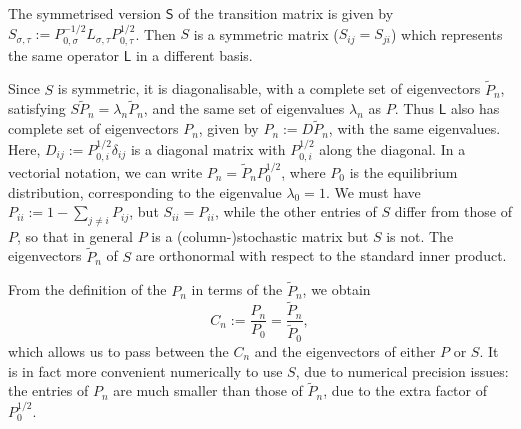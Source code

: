 \documentclass[10pt]{article}
\newcommand{\defeq}{:=}
\newcommand{\tP}{\tilde{P}}
\newcommand{\LL}{\mathsf{L}}
\renewcommand{\SS}{\mathsf{S}}
\newcommand{\transp}{^{\text{\small T}}}
\begin{document}
The symmetrised version  $\SS$ of the transition matrix
is given by $S_{\sigma, \tau} \defeq P_{0,\sigma}^{-1/2} L_{\sigma, \tau} P_{0,\tau}^{1/2}$.
  Then
$S$ is a symmetric
matrix ($S_{ij} = S_{ji}$) which represents the same operator $\LL$ in a
different
basis.  

Since $S$ is symmetric, it is diagonalisable, with a complete set of
eigenvectors $\tP_n$, satisfying $S \tP_n = \lambda_n \tP_n$, and the same set
of
eigenvalues $\lambda_n$ as $P$. Thus $\LL$ also has 
complete set of eigenvectors $P_n$, given by $P_n \defeq D \tP_n$, with the same
eigenvalues.  Here, $D_{ij} \defeq P_{0,i}^{1/2} \delta_{ij}$ is a diagonal matrix
with $P_{0,i}^{1/2}$ along the diagonal.  In a vectorial notation, we can write $P_n
= \tP_n P_0^{1/2}$, where $P_0$ is the equilibrium distribution, corresponding
to the eigenvalue $\lambda_0 = 1$.
% 
We must have $P_{ii} \defeq 1-\sum_{j\neq i} P_{ij}$, but $S_{ii} =
P_{ii}$, while the other entries of $S$ differ from those of $P$, so that in
general 
$P$ is a (column-)stochastic matrix but $S$ is  not.
The eigenvectors $\tP_n$ of $S$ are orthonormal with respect to the standard inner
product.

% 

From the definition of the $P_n$ in terms of
the
$\tP_n$, we obtain
\begin{equation}
 C_n \defeq \frac{P_n}{P_0} = \frac{\tP_n}{\tP_0},
\end{equation}
which allows us to pass between the $C_n$ and 
the eigenvectors of either $P$ or $S$.  It is in fact more convenient numerically
to use $S$, due to numerical precision issues: the entries of $P_n$ are
much smaller than those of $\tP_n$, due to the extra factor of $P_0^{1/2}$.
\end{document}
